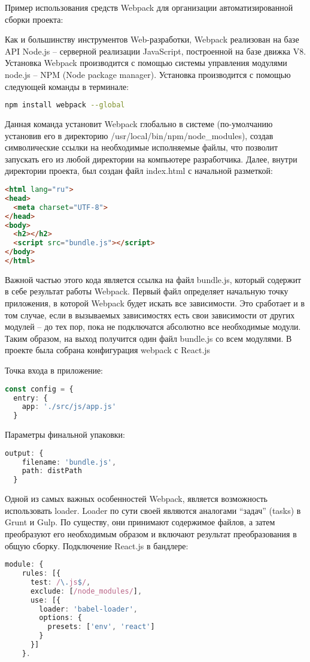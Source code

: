 Пример использования средств Webpack для организации автоматизированной сборки проекта:

Как и большинству инструментов Web-разработки, Webpack реализован на базе API Node.js -- серверной реализации JavaScript, построенной на базе движка V8. Установка Webpack производится с помощью
системы управления модулями node.js -- NPM (Node package manager). Установка производится с помощью следующей команды в терминале:

\begin{lstlisting}[language=bash, label=lst:domain:html]
npm install webpack --global
\end{lstlisting}

Данная команда установит Webpack глобально в системе (по-умолчанию установив его в директорию /usr/local/bin/npm/node\_modules), создав символические ссылки на необходимые исполняемые файлы, что
позволит запускать его из любой директории на компьютере разработчика. Далее, внутри директории проекта, был создан файл index.html с начальной разметкой:

\begin{lstlisting}[language=HTML, label=lst:domain:html]
<html lang="ru">
<head>
  <meta charset="UTF-8">
</head>
<body>
  <h2></h2>
  <script src="bundle.js"></script>
</body>
</html>
\end{lstlisting}

Важной частью этого кода является ссылка на файл bundle.js, который содержит в себе результат работы Webpack.
Первый файл определяет начальную точку приложения, в которой Webpack будет искать все зависимости. Это сработает и в том случае, если в вызываемых зависимостях 
есть свои зависимости от других модулей -- до тех пор, пока не подключатся абсолютно все необходимые модули. Таким образом, на выход получится один файл bundle.js со всем модулями.
В проекте была собрана конфигурация webpack с React.js

Точка входа в приложение:
\begin{lstlisting}[language=TypeScript, label=lst:domain:html]
const config = {
  entry: {
    app: './src/js/app.js'
  }
\end{lstlisting}

Параметры финальной упаковки:
\begin{lstlisting}[language=TypeScript, label=lst:domain:html]
  output: {
    filename: 'bundle.js',
    path: distPath
  }
\end{lstlisting}

Одной из самых важных особенностей Webpack, является возможность использовать loader. Loader по сути своей являются аналогами “задач” (tasks) в Grunt и Gulp. По существу,
они принимают содержимое файлов, а затем преобразуют его необходимым образом и включают результат преобразования в общую сборку.
Подключение React.js в бандлере:
\begin{lstlisting}[language=TypeScript, label=lst:domain:html]
 module: {
    rules: [{
      test: /\.js$/,
      exclude: [/node_modules/],
      use: [{
        loader: 'babel-loader',
        options: {
          presets: ['env', 'react']
        }
      }]
    }.
\end{lstlisting}

